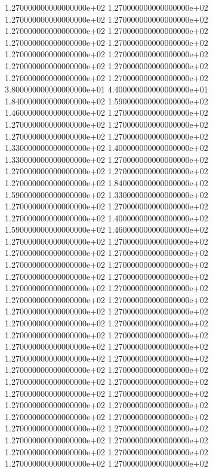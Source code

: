 1.270000000000000000e+02 1.270000000000000000e+02 1.270000000000000000e+02 1.270000000000000000e+02 1.270000000000000000e+02 1.270000000000000000e+02 1.270000000000000000e+02 1.270000000000000000e+02 1.270000000000000000e+02 1.270000000000000000e+02 1.270000000000000000e+02 1.270000000000000000e+02 1.270000000000000000e+02 1.270000000000000000e+02 3.800000000000000000e+01 4.400000000000000000e+01 1.840000000000000000e+02 1.590000000000000000e+02 1.460000000000000000e+02 1.270000000000000000e+02 1.270000000000000000e+02 1.270000000000000000e+02 1.270000000000000000e+02 1.270000000000000000e+02 1.330000000000000000e+02 1.400000000000000000e+02 1.330000000000000000e+02 1.270000000000000000e+02 1.270000000000000000e+02 1.270000000000000000e+02 1.270000000000000000e+02 1.840000000000000000e+02 1.590000000000000000e+02 1.330000000000000000e+02 1.270000000000000000e+02 1.270000000000000000e+02 1.270000000000000000e+02 1.400000000000000000e+02 1.590000000000000000e+02 1.460000000000000000e+02 1.270000000000000000e+02 1.270000000000000000e+02 1.270000000000000000e+02 1.270000000000000000e+02 1.270000000000000000e+02 1.270000000000000000e+02 1.270000000000000000e+02 1.270000000000000000e+02 1.270000000000000000e+02 1.270000000000000000e+02 1.270000000000000000e+02 1.270000000000000000e+02 1.270000000000000000e+02 1.270000000000000000e+02 1.270000000000000000e+02 1.270000000000000000e+02 1.270000000000000000e+02 1.270000000000000000e+02 1.270000000000000000e+02 1.270000000000000000e+02 1.270000000000000000e+02 1.270000000000000000e+02 1.270000000000000000e+02 1.270000000000000000e+02 1.270000000000000000e+02 1.270000000000000000e+02 1.270000000000000000e+02 1.270000000000000000e+02 1.270000000000000000e+02 1.270000000000000000e+02 1.270000000000000000e+02 1.270000000000000000e+02 1.270000000000000000e+02 1.270000000000000000e+02 1.270000000000000000e+02 1.270000000000000000e+02 1.270000000000000000e+02 1.270000000000000000e+02 1.270000000000000000e+02 1.270000000000000000e+02
